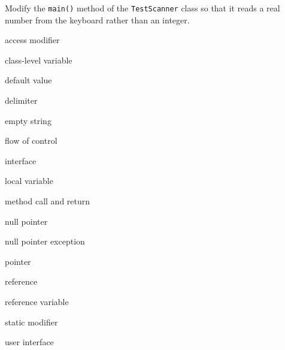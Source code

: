 \label{self-study-exercises}
\begin{SSTUDY}

\item Modify the {\tt main()} method of the {\tt TestScanner} class
  so that it reads a real number from the keyboard rather than an integer.
  
\end{SSTUDY}


\label{self-study-exercises}


\label{chapter-summary}
\label{technical-terms}
\begin{KT}

access modifier

class-level variable

default value

delimiter

empty string

flow of control

interface

local variable

method call and return

null pointer

null pointer exception

pointer 

reference

reference variable

static modifier

user interface
\end{KT}

